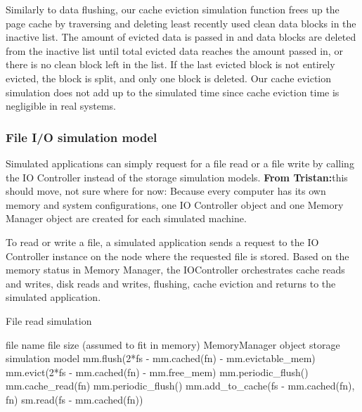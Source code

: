 \documentclass[conference]{IEEEtran}
\newcommand{\Desc}[2]{\State \makebox[2em][l]{#1}#2}
\newcommand{\tristan}[1]{\color{orange}\textbf{From Tristan:}#1\color{black}}
\begin{document}
			Similarly to data flushing, our cache eviction simulation function frees up 
			the page cache by traversing and deleting least recently used clean 
			data blocks in the inactive list.
			The amount of evicted data is passed in and data blocks are deleted 
			from the inactive list until total evicted data reaches the amount 
			passed in, or there is no clean block left in the list.
			If the last evicted block is not entirely evicted, the block is split, 
			and only one block is deleted.
			Our cache eviction simulation does not add up to the simulated time 
			since cache eviction time is negligible in real systems.			

			\subsubsection{File I/O simulation model}			
			
			Simulated applications can simply request for a file read 
			or a file write by calling the IO Controller instead of 
			the storage simulation models. 
			\tristan{this should move, not sure where for now: Because every computer has its own memory and system configurations, 
			one IO Controller object and one Memory Manager object are created 
			for each simulated machine.}
			
			To read or write a file, a simulated application sends a request to the 
			IO Controller instance on the node where the requested file is stored.
			Based on the memory status in Memory Manager, the IOController 
			orchestrates cache reads and writes, disk reads and writes, flushing, cache eviction 
			 and returns to the simulated application.
			
			\begin{algorithm}\caption{File read simulation}\label{alg:read}
				\small
				\begin{algorithmic}[1]
					\Input
        				\Desc{fn}{file name}
        				\Desc{fs}{file size (assumed to fit in memory)}
						\Desc{mm}{MemoryManager object}
						\Desc{sm}{storage simulation model}
   					\EndInput
					\State mm.flush(2*fs - mm.cached(fn) - mm.evictable\_mem) 
					\State mm.evict(2*fs - mm.cached(fn) - mm.free\_mem) 
					  
					    \State mm.periodic\_flush() 
    					\State mm.cache\_read(fn) 
					\EndIf
					 
						\State mm.periodic\_flush() 
						\State mm.add\_to\_cache(fs - mm.cached(fn), fn)
    					\State sm.read(fs - mm.cached(fn))
					\EndIf					
					
				\end{algorithmic}
			\end{algorithm}			
			
\end{document}
